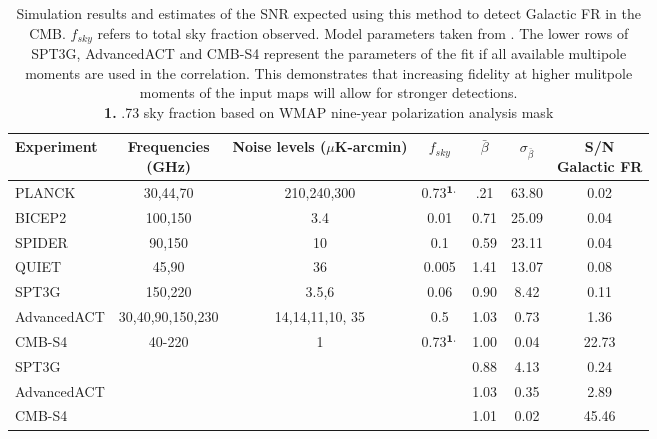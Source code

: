 \documentclass[usenatbib,hidelinks]{mnras}
\begin{document}
\begin{table*}
\centering
\small
\begin{tabular}{l c c c c c c}
Experiment & \pbox{2.5cm}{Frequencies \\ \hspace*{.4cm} (GHz)} & \pbox{3cm}{Noise levels \\ ($\mu$K-arcmin)} & $f_{sky}$ & $\bar{\beta}$ & $\sigma_{\bar{\beta}}$ & \pbox{3cm}{\hspace{.5cm} S/N \\ Galactic FR }\\
\hline
PLANCK & 30,44,70 & 210,240,300 & 0.73$^{\bf \footnotesize 1.}$ & .21 & 63.80 & 0.02 \\
BICEP2 & 100,150 & 3.4 & 0.01 & 0.71 & 25.09 & 0.04 \\
SPIDER & 90,150 & 10  & 0.1 & 0.59 & 23.11 & 0.04\\
QUIET & 45,90 & 36 & 0.005 & 1.41 & 13.07 & 0.08\\ 
SPT3G & 150,220 & 3.5,6 & 0.06 & 0.90 & 8.42 & 0.11 \\
AdvancedACT & 30,40,90,150,230 & 14,14,11,10, 35 & 0.5 & 1.03 & 0.73 & 1.36\\
CMB-S4 & 40-220 & 1 & 0.73$^{\bf \footnotesize 1.}$ & 1.00 & 0.04 & 22.73 \\ \hline \hline
SPT3G & \multicolumn{3}{c}{\dotfill} & 0.88 & 4.13 & 0.24 \\
AdvancedACT &\multicolumn{3}{c}{\dotfill} &  1.03 & 0.35 & 2.89 \\
CMB-S4 & \multicolumn{3}{c}{\dotfill} &  1.01 & 0.02 & 45.46 

\end{tabular}
\caption[Estimated SNR]{Simulation results and estimates of the SNR expected using this method to detect Galactic FR in the CMB. $f_{sky}$ refers to total sky fraction observed. Model parameters taken from \cite{quiet_instrument,cmb-s4,spider:2013,act:2014,bicepbmode:2015,planck:2015i}. 
The lower rows of SPT3G, AdvancedACT and CMB-S4 represent the parameters of the fit if all available multipole moments are used in the correlation. 
This demonstrates that increasing fidelity at higher mulitpole moments of the input maps will allow for stronger detections.  \label{tab:snr-estimate} \\ {\footnotesize {\bf 1.} .73 sky fraction based on WMAP nine-year polarization analysis mask } }
\end{table*}
\end{document}
